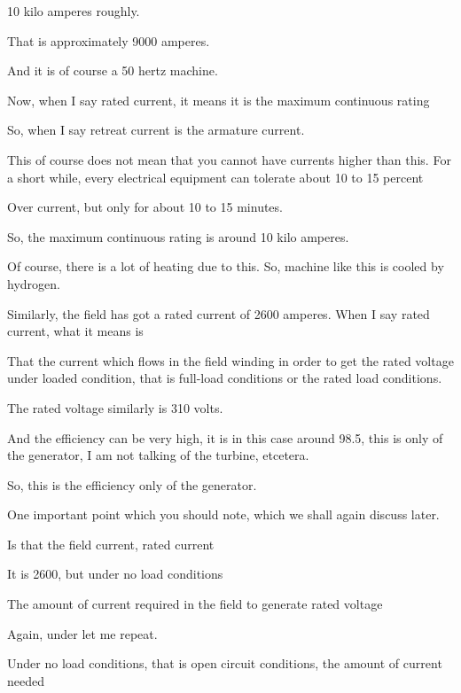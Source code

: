 \documentclass{article}
\begin{document}
10 kilo amperes roughly.

That is approximately 9000 amperes.

And it is of course a 50 hertz machine.

Now, when I say rated current, it means it is the maximum continuous rating

So, when I say retreat current is the armature current.

This of course does not mean that you cannot have currents higher than this. For a short while, every electrical equipment can tolerate about 10 to 15 percent

Over current, but only for about 10 to 15 minutes.

So, the maximum continuous rating is around 10 kilo amperes.

Of course, there is a lot of heating due to this. So, machine like this is cooled by hydrogen.

Similarly, the field has got a rated current of 2600 amperes. When I say rated current, what it means is

That the current which flows in the field winding in order to get the rated voltage under loaded condition, that is full-load conditions or the rated load conditions.

The rated voltage similarly is 310 volts.

And the efficiency can be very high, it is in this case around 98.5, this is only of the generator, I am not talking of the turbine, etcetera.

So, this is the efficiency only of the generator.

One important point which you should note, which we shall again discuss later.

Is that the field current, rated current

It is 2600, but under no load conditions

The amount of current required in the field to generate rated voltage

Again, under let me repeat.

Under no load conditions, that is open circuit conditions, the amount of current needed
\end{document}
